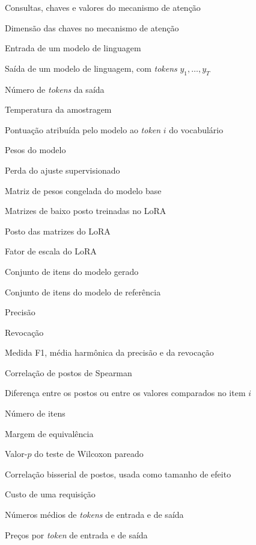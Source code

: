 %

\begin{simbolos} \itemsep -1pt
	\item[$ Q, K, V $] Consultas, chaves e valores do mecanismo de atenção
	\item[$ d_k $] Dimensão das chaves no mecanismo de atenção
	\item[$ x $] Entrada de um modelo de linguagem
	\item[$ y $] Saída de um modelo de linguagem, com \textit{tokens} $y_1, \ldots, y_T$
	\item[$ T $] Número de \textit{tokens} da saída
	\item[$ \tau $] Temperatura da amostragem
	\item[$ z_i $] Pontuação atribuída pelo modelo ao \textit{token} $i$ do vocabulário

	\item[$ \theta $] Pesos do modelo
	\item[$ \mathcal{L} $] Perda do ajuste supervisionado
	\item[$ W_0 $] Matriz de pesos congelada do modelo base
	\item[$ A, B $] Matrizes de baixo posto treinadas no LoRA
	\item[$ r $] Posto das matrizes do LoRA
	\item[$ \alpha $] Fator de escala do LoRA

	\item[$ G $] Conjunto de itens do modelo gerado
	\item[$ E $] Conjunto de itens do modelo de referência
	\item[$ P $] Precisão
	\item[$ R $] Revocação
	\item[$ F_1 $] Medida F1, média harmônica da precisão e da revocação
	\item[$ \rho $] Correlação de postos de Spearman
	\item[$ d_i $] Diferença entre os postos ou entre os valores comparados no item $i$
	\item[$ n $] Número de itens
	\item[$ \Delta $] Margem de equivalência
	\item[$ p $] Valor-$p$ do teste de Wilcoxon pareado
	\item[$ r_b $] Correlação bisserial de postos, usada como tamanho de efeito

	\item[$ C $] Custo de uma requisição
	\item[$ t_{\text{in}}, t_{\text{out}} $] Números médios de \textit{tokens} de entrada e de saída
	\item[$ p_{\text{in}}, p_{\text{out}} $] Preços por \textit{token} de entrada e de saída
\end{simbolos}

